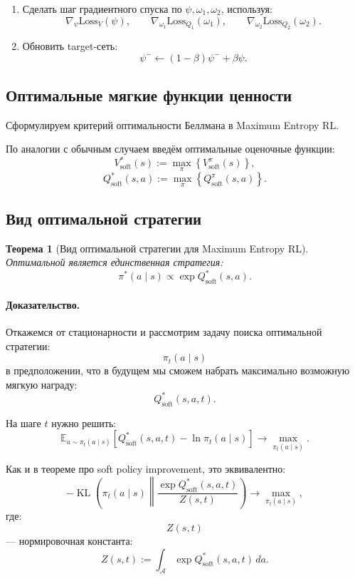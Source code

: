 \documentclass[12pt,a4paper]{article}
\newtheorem{theorem}{Теорема}
\begin{document}
\begin{enumerate}
    \item Сделать шаг градиентного спуска по $\psi,\omega_1,\omega_2$, используя:
    \[
    \nabla_\psi\mathrm{Loss}_V(\psi),
    \qquad
    \nabla_{\omega_1}\mathrm{Loss}_{Q_1}(\omega_1),
    \qquad
    \nabla_{\omega_2}\mathrm{Loss}_{Q_2}(\omega_2).
    \]

    \item Обновить target-сеть:
    \[
    \psi^-
    \leftarrow
    (1-\beta)\psi^-
    +
    \beta\psi.
    \]
\end{enumerate}

\subsection{Оптимальные мягкие функции ценности}

Сформулируем критерий оптимальности Беллмана в Maximum Entropy RL.

По аналогии с обычным случаем введём оптимальные оценочные функции:
\[
V^\ast_{\mathrm{soft}}(s)
:=
\max_{\pi}
\left\{
V^\pi_{\mathrm{soft}}(s)
\right\},
\]
\[
Q^\ast_{\mathrm{soft}}(s,a)
:=
\max_{\pi}
\left\{
Q^\pi_{\mathrm{soft}}(s,a)
\right\}.
\]

\subsection{Вид оптимальной стратегии}

\begin{theorem}[Вид оптимальной стратегии для Maximum Entropy RL]
Оптимальной является единственная стратегия:
\[
\pi^\ast(a\mid s)
\propto
\exp Q^\ast_{\mathrm{soft}}(s,a).
\]
\end{theorem}

\paragraph{Доказательство.}

Откажемся от стационарности и рассмотрим задачу поиска оптимальной стратегии:
\[
\pi_t(a\mid s)
\]
в предположении, что в будущем мы сможем набрать максимально возможную мягкую награду:
\[
Q^\ast_{\mathrm{soft}}(s,a,t).
\]

На шаге $t$ нужно решить:
\[
\mathbb E_{a\sim\pi_t(a\mid s)}
\left[
Q^\ast_{\mathrm{soft}}(s,a,t)
-
\ln\pi_t(a\mid s)
\right]
\to
\max_{\pi_t(a\mid s)}.
\]

Как и в теореме про soft policy improvement, это эквивалентно:
\[
-
\operatorname{KL}
\left(
\pi_t(a\mid s)
\middle\|
\frac{
\exp Q^\ast_{\mathrm{soft}}(s,a,t)
}{
Z(s,t)
}
\right)
\to
\max_{\pi_t(a\mid s)},
\]
где:
\[
Z(s,t)
\]
--- нормировочная константа:
\[
Z(s,t)
:=
\int_{\mathcal A}
\exp Q^\ast_{\mathrm{soft}}(s,a,t)
\,da.
\]
\end{document}
